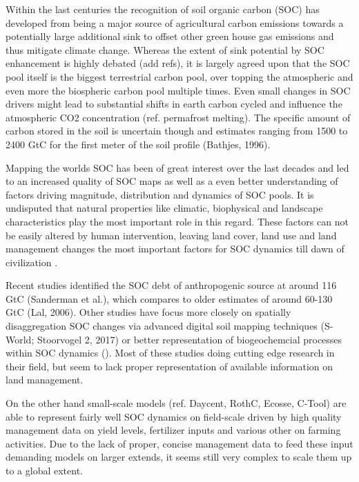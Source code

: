 \documentclass[gc, manuscript]{copernicus}
\begin{document}


\newpage

\introduction

Within the last centuries the recognition of soil organic carbon (SOC)
has developed from being a major source of agricultural carbon emissions
towards a potentially large additional sink to offset other green house
gas emissions and thus mitigate climate change. Whereas the extent of
sink potential by SOC enhancement is highly debated (add refs), it is
largely agreed upon that the SOC pool itself is the biggest terrestrial
carbon pool, over topping the atmospheric and even more the biospheric
carbon pool multiple times. Even small changes in SOC drivers might lead
to substantial shifts in earth carbon cycled and influence the
atmospheric CO2 concentration (ref. permafrost melting). The specific
amount of carbon stored in the soil is uncertain though and estimates
ranging from 1500 to 2400 GtC for the first meter of the soil profile
(Bathjes, 1996).

Mapping the worlds SOC has been of great interest over the last decades
and led to an increased quality of SOC maps as well as a even better
understanding of factors driving magnitude, distribution and dynamics of
SOC pools. It is undisputed that natural properties like climatic,
biophysical and landscape characteristics play the most important role
in this regard. These factors can not be easily altered by human
intervention, leaving land cover, land use and land management changes
the most important factors for SOC dynamics till dawn of civilization .

Recent studies identified the SOC debt of anthropogenic source at around
116 GtC (Sanderman et al.), which compares to older estimates of around
60-130 GtC (Lal, 2006). Other studies have focus more closely on
spatially disaggregation SOC changes via advanced digital soil mapping
techniques (S-World; Stoorvogel 2, 2017) or better representation of
biogeochemcial processes within SOC dynamics (). Most of these studies
doing cutting edge research in their field, but seem to lack proper
representation of available information on land management.

On the other hand small-scale models (ref. Daycent, RothC, Ecosse,
C-Tool) are able to represent fairly well SOC dynamics on field-scale
driven by high quality management data on yield levels, fertilizer
inputs and various other on farming activities. Due to the lack of
proper, concise management data to feed these input demanding models on
larger extends, it seems still very complex to scale them up to a global
extent.
\end{document}
